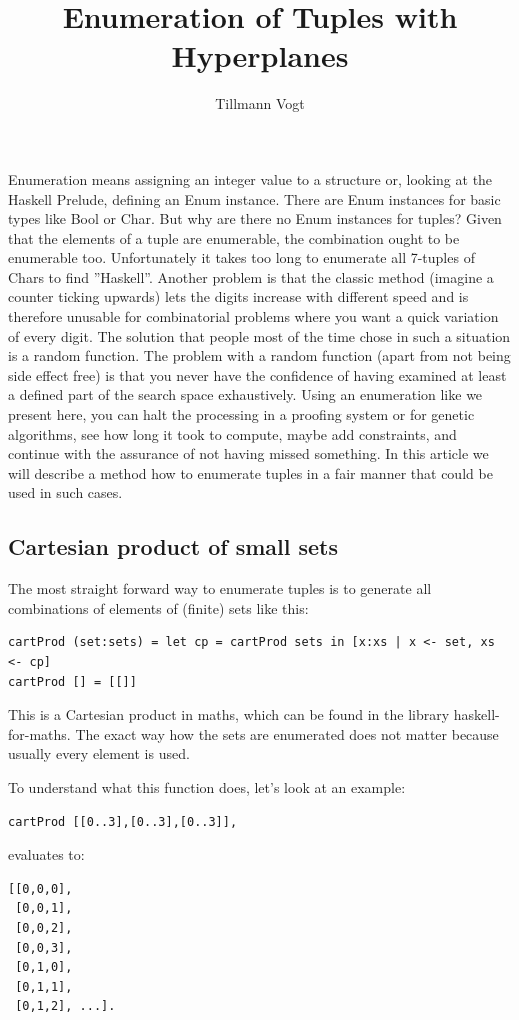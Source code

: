 \documentclass{tmr}
\title{Enumeration of Tuples with Hyperplanes} %
\author{Tillmann Vogt\email{tillk.vogt@googlemail.com}}
\newcommand{\authornote}[3]{{\color{#2} {\sc #1}: #3}}
\newcommand\bay[1]{\authornote{edward}{blue}{#1}}
\newcommand\tkv[1]{\authornote{Tillmann}{green}{#1}}
\begin{document}
\begin{introduction}
Enumeration means assigning an integer value to a structure or, looking at the Haskell Prelude, defining an Enum instance. There are Enum instances for basic types like Bool or Char. But why are there no Enum instances for tuples?  Given that the elements of a tuple are enumerable, the combination ought to be enumerable too. Unfortunately it takes  too long to \eg enumerate all 7-tuples of Chars to find ''Haskell''. Another problem is that the classic method (imagine a counter ticking upwards) lets the digits increase with different speed and is therefore unusable for combinatorial problems where you want a quick variation of every digit. The solution that people most of the time chose in such a situation is a random function. The problem with a random function (apart from not being side effect free) is that you never have the confidence of having examined at least a defined part of the search space exhaustively. Using an enumeration like we present here, you can halt the processing \eg in a proofing system or for genetic algorithms, see how long it took to compute, maybe add constraints, and continue with the assurance of not having missed something. In this article we will describe a method how to enumerate tuples in a fair manner that could be used in such cases.
\end{introduction}

\subsection{Cartesian product of small sets}

The most straight forward way to enumerate tuples is to generate all combinations of elements of (finite) sets like this:
\begin{Verbatim}
cartProd (set:sets) = let cp = cartProd sets in [x:xs | x <- set, xs <- cp]
cartProd [] = [[]]
\end{Verbatim}
This is a Cartesian product in maths, which can be found in the library haskell-for-maths. The exact way how the sets are enumerated does not matter because usually every element is used.

To understand what this function does, let's look at an example:

\begin{Verbatim}
cartProd [[0..3],[0..3],[0..3]],
\end{Verbatim}
evaluates to:
\begin{Verbatim}
[[0,0,0],
 [0,0,1],
 [0,0,2],
 [0,0,3],
 [0,1,0],
 [0,1,1],
 [0,1,2], ...].
\end{Verbatim}
\end{document}
